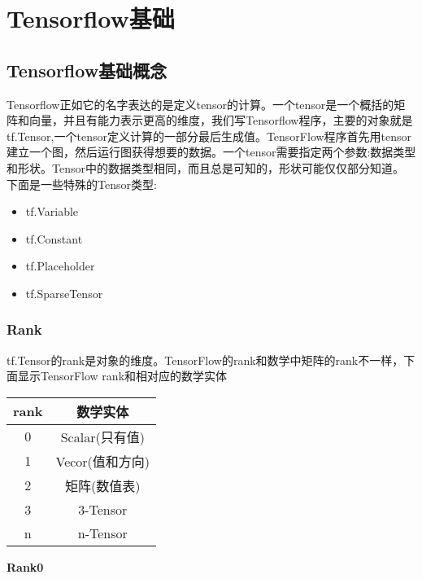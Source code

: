 \chapter{Tensorflow基础}
\section{Tensorflow基础概念}
Tensorflow正如它的名字表达的是定义tensor的计算。一个tensor是一个概括的矩阵和向量，并且有能力表示更高的维度，我们写Tensorflow程序，主要的对象就是tf.Tensor,一个tensor定义计算的一部分最后生成值。TensorFlow程序首先用tensor建立一个图，然后运行图获得想要的数据。一个tensor需要指定两个参数:数据类型和形状。Tensor中的数据类型相同，而且总是可知的，形状可能仅仅部分知道。
下面是一些特殊的Tensor类型:
\begin{itemize}
\item	tf.Variable
\item	tf.Constant
\item	tf.Placeholder
\item	tf.SparseTensor
\end{itemize}
\subsection{Rank}
tf.Tensor的rank是对象的维度。TensorFlow的rank和数学中矩阵的rank不一样，下面显示TensorFlow rank和相对应的数学实体
\begin{center}
\begin{tabular}{|c|c|}
\hline
rank&数学实体\\
\hline
0&Scalar(只有值)\\
\hline
1&Vecor(值和方向)\\
\hline
2&矩阵(数值表)\\
\hline
3&3-Tensor\\
\hline
n&n-Tensor\\
\hline
\end{tabular}
\end{center}
\textbf{Rank0}

